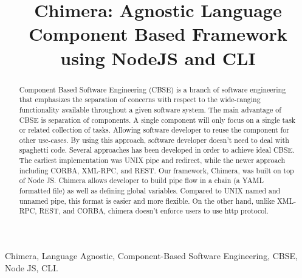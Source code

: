 \documentclass[conference]{IEEEtran}
\begin{document}
\title{Chimera: Agnostic Language Component Based Framework using NodeJS and CLI}

\author{
\and
{}
\and
{}
}

\maketitle


\begin{abstract}
    Component Based Software Engineering (CBSE) is a branch of software engineering that emphasizes the separation of concerns with respect to the wide-ranging functionality available throughout a given software system.  The main advantage of CBSE is separation of components. A single component will only focus on a single task or related collection of tasks. Allowing software developer to reuse the component for other use-cases. By using this approach, software developer doesn't need to deal with spaghetti code. Several approaches has been developed in order to achieve ideal CBSE. The earliest implementation was UNIX pipe and redirect, while the newer approach including CORBA, XML-RPC, and REST. Our framework, Chimera, was built on top of Node JS. Chimera allows developer to build pipe flow in a chain (a YAML formatted file) as well as defining global variables. Compared to UNIX named and unnamed pipe, this format is easier and more flexible. On the other hand, unlike XML-RPC, REST, and CORBA, chimera doesn't enforce users to use http protocol.
\end{abstract}

\begin{IEEEkeywords}
Chimera, Language Agnostic, Component-Based Software Engineering, CBSE, Node JS, CLI.
\end{IEEEkeywords}

\IEEEpeerreviewmaketitle
\end{document}
